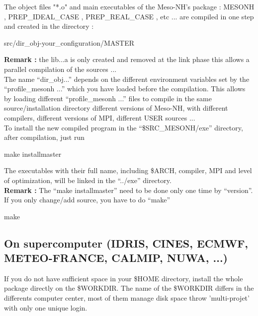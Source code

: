 The  object files "*.o"  and  main executables of the Meso-NH's package : MESONH , PREP\_IDEAL\_CASE , PREP\_REAL\_CASE , etc ... are compiled in one step and created in the directory :
\begin{bashcode}
src/dir_obj-your_configuration/MASTER 
\end{bashcode}

\textbf{Remark :} the lib...a is only created and removed at the link phase this allows a parallel compilation of the sources ... \\

The name ``dir\_obj...'' depends on the different environment variables set by the ``profile\_mesonh ...'' which you have loaded before the compilation. This allows by loading different ``profile\_mesonh ...'' files to compile in the same source/installation directory different versions of Meso-NH, with different compilers, different versions of MPI, different USER sources ... \\

To install the new compiled program in the ``\$SRC\_MESONH/exe'' directory, after compilation, just run
\begin{bashcode}
make installmaster
\end{bashcode}

The executables with their full name, including \$ARCH, compiler, MPI and level of optimization, will be linked in the ``../exe'' directory. \\

\textbf{Remark :} The ``make installmaster'' need to be done only one time by ``version''.  If you only change/add source, you have to do ``make'' 
\begin{bashcode}
make
\end{bashcode}

\subsection{On supercomputer (IDRIS, CINES, ECMWF, METEO-FRANCE, CALMIP, NUWA, ...)}

If you do not have sufficient space in your \$HOME directory, install the whole package directly on the \$WORKDIR. The name of the \$WORKDIR differs in the differents computer center, most of them manage disk space throw 'multi-projet' with only one unique login. \\

